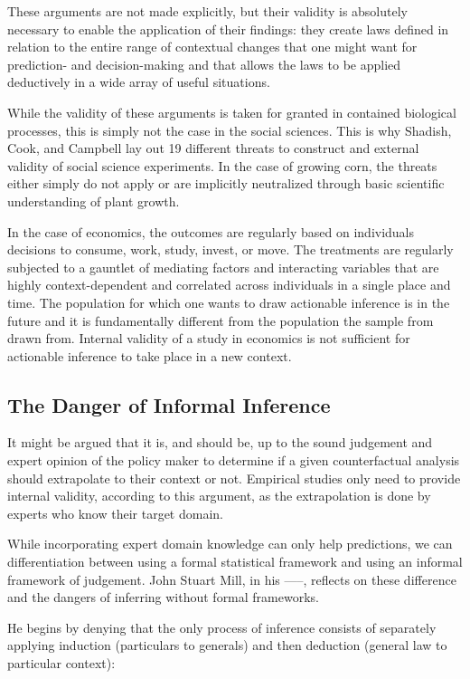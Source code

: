 \documentclass[a4paper,12pt]{article}
\begin{document}
These arguments are not made explicitly, but their validity is absolutely necessary to enable the application of their findings: they create laws defined in relation to the entire range of contextual changes that one might want for prediction- and decision-making and that allows the laws to be applied deductively in a wide array of useful situations.

While the validity of these arguments is taken for granted in contained biological processes, this is simply not the case in the social sciences. This is why Shadish, Cook, and Campbell lay out 19 different threats to construct and external validity of social science experiments. In the case of growing corn, the threats either simply do not apply or are implicitly neutralized through basic scientific understanding of plant growth.

In the case of economics, the outcomes are regularly based on individuals decisions to consume, work, study, invest, or move. The treatments are regularly subjected to a gauntlet of mediating factors and interacting variables that are highly context-dependent and correlated across individuals in a single place and time. The population for which one wants to draw actionable inference is in the future and it is fundamentally different from the population the sample from drawn from. Internal validity of a study in economics is not sufficient for actionable inference to take place in a new context. 

\subsection{The Danger of Informal Inference}

It might be argued that it is, and should be, up to the sound judgement and expert opinion of the policy maker to determine if a given counterfactual analysis should extrapolate to their context or not. Empirical studies only need to provide internal validity, according to this argument, as the extrapolation is done by experts who know their target domain.

While incorporating expert domain knowledge can only help predictions, we can differentiation between using a formal statistical framework and using an informal framework of judgement. John Stuart Mill, in his -----, reflects on these difference and the dangers of inferring without formal frameworks.

He begins by denying that the only process of inference consists of separately applying induction (particulars to generals) and then deduction (general law to particular context):
\end{document}
